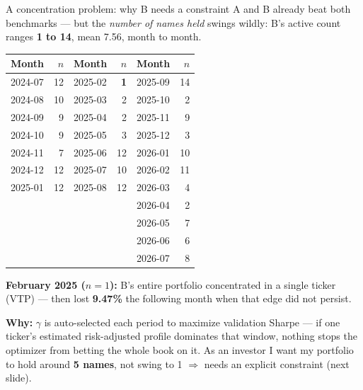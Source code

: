 \documentclass[aspectratio=169]{beamer}
\newcommand{\bad}[1]{\textcolor{red!60!black}{\textbf{#1}}}
\begin{document}
\begin{frame}{A concentration problem: why B needs a constraint}
  \small
  A and B already beat both benchmarks --- but the \emph{number of names held} swings wildly:
  B's active count ranges \textbf{1 to 14}, mean 7.56, month to month.
  \vspace{0.15cm}
  \begin{center}
  \tiny
  \begin{tabular}{@{}lr@{\hspace{10pt}}lr@{\hspace{10pt}}lr@{}}
  \toprule
  Month & $n$ & Month & $n$ & Month & $n$ \\
  \midrule
  2024-07 & 12 & 2025-02 & \bad{1}  & 2025-09 & 14 \\
  2024-08 & 10 & 2025-03 & 2  & 2025-10 & 2  \\
  2024-09 & 9  & 2025-04 & 2  & 2025-11 & 9  \\
  2024-10 & 9  & 2025-05 & 3  & 2025-12 & 3  \\
  2024-11 & 7  & 2025-06 & 12 & 2026-01 & 10 \\
  2024-12 & 12 & 2025-07 & 10 & 2026-02 & 11 \\
  2025-01 & 12 & 2025-08 & 12 & 2026-03 & 4  \\
          &    &         &    & 2026-04 & 2  \\
          &    &         &    & 2026-05 & 7  \\
          &    &         &    & 2026-06 & 6  \\
          &    &         &    & 2026-07 & 8  \\
  \bottomrule
  \end{tabular}
  \end{center}
  \vspace{0.1cm}
  \bad{February 2025 ($n=1$):} B's entire portfolio concentrated in a single ticker (VTP) ---
  then lost \bad{9.47\%} the following month when that edge did not persist.

  \vspace{0.1cm}
  \textbf{Why:} $\gamma$ is auto-selected each period to maximize validation Sharpe --- if one
  ticker's estimated risk-adjusted profile dominates that window, nothing stops the optimizer
  from betting the whole book on it. As an investor I want my portfolio to hold around
  \textbf{5 names}, not swing to 1 $\Rightarrow$ needs an explicit constraint (next slide).
\end{frame}
\end{document}

